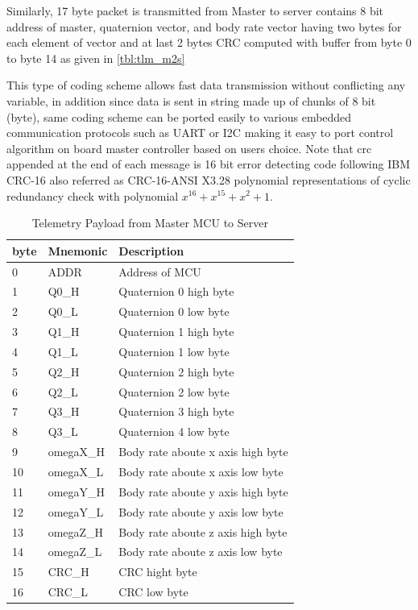 \noindent Similarly, 17 byte packet is transmitted from Master to server contains 8 bit address of master, quaternion vector, and body rate vector having two bytes for each element of vector and at last 2 bytes CRC computed with buffer from byte 0 to byte 14 as given in \autoref{tbl:tlm_m2s}

This type of coding scheme allows fast data transmission without conflicting any variable, in addition since data is sent in string made up of chunks of 8 bit (byte), same coding scheme can be ported easily to various embedded communication protocols such as UART or I2C making it easy to port control algorithm on board master controller based on users choice. Note that \acrshort{crc} appended at the end of each message is 16 bit error detecting code following IBM CRC-16 also referred as CRC-16-ANSI X3.28 polynomial representations of cyclic redundancy check with polynomial $x^{16}+x^{15}+x^2+1$.
\begin{table}[!h]
        \centering
        
\begin{tabular}{|p{}|p{}|p{}|}
\hline 
 byte & Mnemonic & Description \\
\hline 
 0 & ADDR & Address of MCU \\
\hline 
 1 & Q0\_H & Quaternion 0 high byte \\
\hline 
 2 & Q0\_L & Quaternion 0 low byte \\
\hline 
 3 & Q1\_H & Quaternion 1 high byte \\
\hline 
 4 & Q1\_L & Quaternion 1 low byte \\
\hline 
 5 & Q2\_H & Quaternion 2 high byte \\
\hline 
 6 & Q2\_L & Quaternion 2 low byte \\
\hline 
 7 & Q3\_H & Quaternion 3 high byte \\
\hline 
 8 & Q3\_L & Quaternion 4 low byte \\
\hline 
 9 & omegaX\_H & Body rate aboute x axis high byte \\
\hline 
 10 & omegaX\_L & Body rate aboute x axis low byte \\
\hline 
 11 & omegaY\_H & Body rate aboute y axis high byte \\
\hline 
 12 & omegaY\_L & Body rate aboute y axis low byte \\
\hline 
 13 & omegaZ\_H & Body rate aboute z axis high byte \\
\hline 
 14 & omegaZ\_L & Body rate aboute z axis low byte \\
\hline 
 15 & CRC\_H & CRC hight byte \\
\hline 
 16 & CRC\_L & CRC low byte \\
 \hline
\end{tabular}
        \caption{Telemetry Payload from Master MCU to Server}
        \label{tbl:tlm_m2s}
        \end{table}

